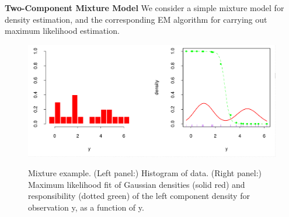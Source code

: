 \documentclass[11pt]{beamer}
\begin{document}
\begin{frame}
\textbf{Two-Component Mixture Model}\linebreak
\textsf{We consider a simple mixture model for density estimation,
and the corresponding EM algorithm for carrying out maximum likelihood
estimation.}



\begin{figure}

\includegraphics[scale=0.17]{fig1.png}
\label{Histogram of data}
\caption{Mixture example. (Left panel:) Histogram of data. (Right panel:)
Maximum likelihood fit of Gaussian densities (solid red) and responsibility (dotted green) of the left component density for observation y, as a function of y.}






\end{figure}

\end{frame}
\end{document}
